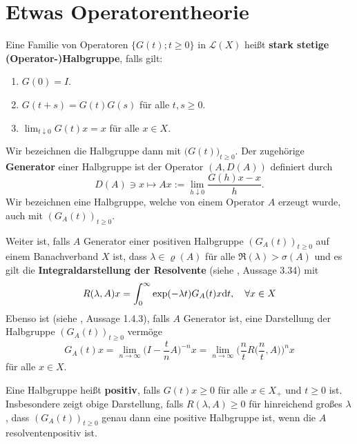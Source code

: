 \section{Etwas Operatorentheorie}

\par
Eine Familie von Operatoren $\{G(t); t\geq0\}$ in $\mathcal L(X)$  heißt \textbf{stark stetige (Operator-)Halbgruppe}, falls gilt:
\begin{enumerate}
\item $G(0)=I$.
\item $G(t+s)=G(t)G(s)$ für alle $t,s\geq0$.
\item $\lim_{t\downarrow 0}G(t)x=x$ für alle $x\in X$.
\end{enumerate}
Wir bezeichnen die Halbgruppe dann mit  $\big(G(t)\big)_{t\geq0}$. Der zugehörige \textbf{Generator} einer Halbgruppe ist der Operator $(A, D(A))$ definiert durch \begin{equation*}
D(A)\ni x\mapsto Ax:=\lim_{h\downarrow 0}\frac{G(h)x - x}{h}.
\end{equation*}
Wir bezeichnen eine Halbgruppe, welche von einem Operator $A$ erzeugt wurde, auch mit $(G_A(t))_{t\geq0}$. 

\par
Weiter ist, falls $A$ Generator einer positiven Halbgruppe $(G_A(t))_{t\geq0}$ auf einem Banachverband $X$ ist, dass $\lambda\in\varrho(A)$ für alle $\mathfrak R(\lambda)> \sigma(A)$ und es gilt die \textbf{Integraldarstellung der Resolvente} (siehe \cite{banasiak_arlotti_2006}, Aussage 3.34) mit
\begin{equation*}\label{eq:}
R(\lambda, A)x=\int_0^\infty \exp(-\lambda t)G_A(t)x\textnormal dt,\quad \forall x\in X
\end{equation*}
Ebenso ist (siehe \cite{pazy_1983}, Aussage 1.4.3), falls $A$ Generator ist,  eine Darstellung der Halbgruppe $(G_A(t))_{t\geq0}$ vermöge
\begin{equation*}\label{Darstellung der Gruppe mithilfe der Resolvente}
G_A(t)x = \lim_{n\to\infty}\Big(I- \frac t n A\Big)^{-n}x = \lim_{n\to\infty} \Big(\frac n t R\Big(\frac n t, A\Big)\Big)^n x
\end{equation*}
für alle $x\in X$.

\par
Eine Halbgruppe heißt \textbf{positiv}, falls  $G(t)x\geq0$ für alle $x\in X_+$ und $t\geq0$ ist. Insbesondere zeigt obige Darstellung, falls $R(\lambda, A)\geq0$ für hinreichend großes $\lambda$, dass $(G_A(t))_{t\geq0}$ genau dann eine positive Halbgruppe ist, wenn die $A$ resolventenpositiv ist.

